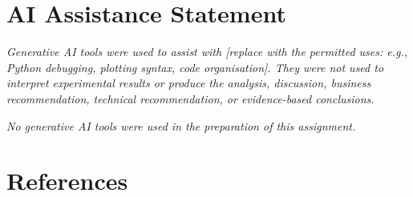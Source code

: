 \documentclass[11pt,a4paper]{article}
\newif\ifdraftinstructions
\newcommand{\instruction}[1]{%
  \ifdraftinstructions
    \begin{instructionbox}[title=What to write here]
      \small\color{SecondaryText}#1
    \end{instructionbox}
  \fi
}
\begin{document}


\section{AI Assistance Statement}
\instruction{This statement is mandatory. Adapt one of the formulations below truthfully. Delete the option that does not apply. Generative AI may assist with programming tasks, but it may not perform the interpretation of experimental results, discussion, business recommendation, technical recommendation, or evidence-based conclusions.}

\begin{businessbox}[title=Option A - Generative AI was used for permitted assistance]
\emph{Generative AI tools were used to assist with [replace with the permitted uses: e.g., Python debugging, plotting syntax, code organisation]. They were not used to interpret experimental results or produce the analysis, discussion, business recommendation, technical recommendation, or evidence-based conclusions.}
\end{businessbox}

\begin{businessbox}[title=Option B - No generative AI was used]
\emph{No generative AI tools were used in the preparation of this assignment.}
\end{businessbox}


\section*{References}
\instruction{Cite the data source, libraries, algorithms/methods, and any external references used. Add BibTeX entries to \texttt{references.bib} and cite them in the report with commands such as \texttt{\string\parencite\{key\}}. Remove references that are not cited.}

\printbibliography[heading=none]


\clearpage
\appendix
\end{document}
